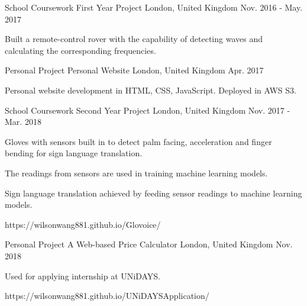 
\begin{cventries}
    
    \cventry
    {School Coursework} %
    {First Year Project} %
    {London, United Kingdom} %
    {Nov. 2016 - May. 2017} %
    {
      \begin{cvitems} %
        \item {Built a remote-control rover with the capability of detecting waves
        and calculating the corresponding frequencies.}
      \end{cvitems}
    }
    
    \cventry
    {Personal Project} %
    {Personal Website} %
    {London, United Kingdom} %
    {Apr. 2017} %
    {
      \begin{cvitems} %
        \item {Personal website development in HTML, CSS, JavaScript. Deployed in AWS S3.}
      \end{cvitems}
    }
    
    \cventry
    {School Coursework} %
    {Second Year Project} %
    {London, United Kingdom} %
    {Nov. 2017 - Mar. 2018} %
    {
      \begin{cvitems} %
        \item {Gloves with sensors built in to detect palm facing, acceleration and finger bending for sign language translation.}
        \item {The readings from sensors are used in training machine learning models.}
        \item {Sign language translation achieved by feeding sensor readings to machine learning models.}
        \item {https://wilsonwang881.github.io/Glovoice/}
      \end{cvitems}
    }
    
    \cventry
    {Personal Project} %
    {A Web-based Price Calculator} %
    {London, United Kingdom} %
    {Nov. 2018} %
    {
      \begin{cvitems} %
        \item {Used for applying internship at UNiDAYS.}
        \item {https://wilsonwang881.github.io/UNiDAYSApplication/}
      \end{cvitems}
    }
    

\end{cventries}
